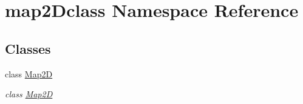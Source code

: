 \hypertarget{namespacemap2Dclass}{}\section{map2\+Dclass Namespace Reference}
\label{namespacemap2Dclass}
\subsection*{Classes}
\begin{DoxyCompactItemize}
\item 
class \hyperlink{classmap2Dclass_1_1Map2D}{Map2D}
\begin{DoxyCompactList}\small\item\em class \hyperlink{classmap2Dclass_1_1Map2D}{Map2D} \end{DoxyCompactList}\end{DoxyCompactItemize}
